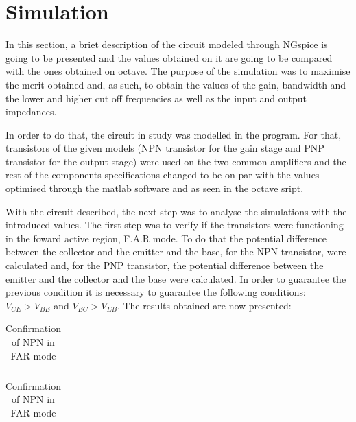 \section{Simulation}
\label{sec:simulation}

\par In this section, a briet description of the circuit modeled through NGspice is going to be presented and the values obtained on it are going to be compared with the ones obtained on octave. The purpose of the simulation was to maximise the merit obtained and, as such, to obtain the values of the gain, bandwidth and the lower and higher  cut off frequencies as well as the input and output impedances.

\par In order to do that, the circuit in study was modelled in the program. For that, transistors of the given models (NPN transistor for the gain stage and PNP transistor for the output stage) were used on the two common amplifiers and the rest of the components specifications changed to be on par with the values optimised through the matlab software and as seen in the octave sript.

\par With the circuit described, the next step was to analyse the simulations with the introduced values. The first step was to verify if the transistors were functioning in the foward active region, F.A.R mode. To do that the potential difference between the collector and the emitter and the base, for the NPN transistor, were calculated and, for the PNP transistor, the potential difference between the emitter and the collector and the base were calculated. In order to guarantee the previous condition it is necessary to guarantee the following conditions: $V_{CE}>V_{BE}$ and $V_{EC}>V_{EB}$. The results obtained are now presented:

\begin{table}[ht]
  \centering
  \begin{tabular}{|l|r|}
    \hline    
   
     \end{tabular}
  \caption{Confirmation of NPN in FAR mode}
 
\end{table}


\begin{table}[ht]
  \centering
  \begin{tabular}{|l|r|}
    \hline    
   
     \end{tabular}
  \caption{Confirmation of NPN in FAR mode}
    
\end{table}

